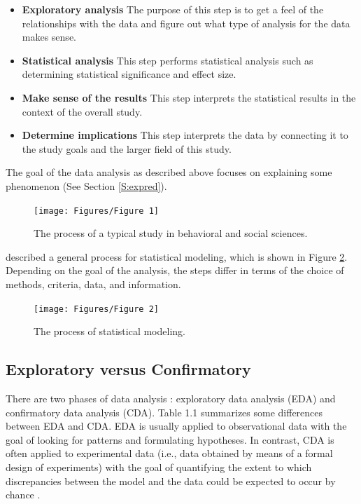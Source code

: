 \documentclass[]{book}
\theoremstyle{definition}
\theoremstyle{definition}
\theoremstyle{definition}
\theoremstyle{remark}
\begin{document}
\begin{itemize}
\item
  \textbf{Exploratory analysis} The purpose of this step is to get a
  feel of the relationships with the data and figure out what type of
  analysis for the data makes sense.
\item
  \textbf{Statistical analysis} This step performs statistical analysis
  such as determining statistical significance and effect size.
\item
  \textbf{Make sense of the results} This step interprets the
  statistical results in the context of the overall study.
\item
  \textbf{Determine implications} This step interprets the data by
  connecting it to the study goals and the larger field of this study.
\end{itemize}

The goal of the data analysis as described above focuses on explaining
some phenomenon (See Section \ref{S:expred}).

\begin{figure}

{\centering \texttt{[image: Figures/Figure 1]} 

}

\caption{The process of a typical study in behavioral and social sciences.}\label{fig:study}
\end{figure}

\citet{shmueli2010model} described a general process for statistical
modeling, which is shown in Figure \ref{fig:modeling}. Depending on the
goal of the analysis, the steps differ in terms of the choice of
methods, criteria, data, and information.

\begin{figure}

{\centering \texttt{[image: Figures/Figure 2]} 

}

\caption{The process of statistical modeling.}\label{fig:modeling}
\end{figure}

\subsection{Exploratory versus
Confirmatory}\label{exploratory-versus-confirmatory}

There are two phases of data analysis \citep{good1983data}: exploratory
data analysis (EDA) and confirmatory data analysis (CDA). Table 1.1
summarizes some differences between EDA and CDA. EDA is usually applied
to observational data with the goal of looking for patterns and
formulating hypotheses. In contrast, CDA is often applied to
experimental data (i.e., data obtained by means of a formal design of
experiments) with the goal of quantifying the extent to which
discrepancies between the model and the data could be expected to occur
by chance \citep{gelman2004eda}.
\end{document}

